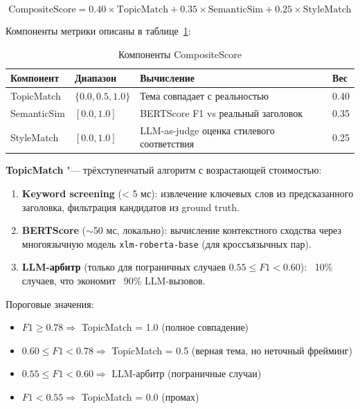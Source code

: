 \begin{equation}
\text{CompositeScore} = 0.40 \times \text{TopicMatch} + 0.35 \times \text{SemanticSim} + 0.25 \times \text{StyleMatch}
\label{eq:composite}
\end{equation}

Компоненты метрики описаны в таблице~\ref{tab:composite_components}:

\begin{table}[h!]
\centering
\caption{Компоненты CompositeScore}
\label{tab:composite_components}
\begin{tabular}{llll}
\toprule
\textbf{Компонент} & \textbf{Диапазон} & \textbf{Вычисление} & \textbf{Вес} \\
\midrule
TopicMatch & $\{0.0, 0.5, 1.0\}$ & Тема совпадает с реальностью & 0.40 \\
SemanticSim & $[0.0, 1.0]$ & BERTScore F1 vs реальный заголовок & 0.35 \\
StyleMatch & $[0.0, 1.0]$ & LLM-as-judge оценка стилевого соответствия & 0.25 \\
\bottomrule
\end{tabular}
\end{table}

\textbf{TopicMatch} "--- трёхступенчатый алгоритм с возрастающей стоимостью:

\begin{enumerate}
    \item \textbf{Keyword screening} (< 5 мс): извлечение ключевых слов из предсказанного заголовка, фильтрация кандидатов из ground truth.
    \item \textbf{BERTScore} ($\sim$50 мс, локально): вычисление контекстного сходства через многоязычную модель \texttt{xlm-roberta-base} (для кроссъязычных пар).
    \item \textbf{LLM-арбитр} (только для пограничных случаев $0.55 \leq F1 < 0.60$): ~10\% случаев, что экономит ~90\% LLM-вызовов.
\end{enumerate}

Пороговые значения:
\begin{itemize}
    \item $F1 \geq 0.78 \Rightarrow$ TopicMatch = 1.0 (полное совпадение)
    \item $0.60 \leq F1 < 0.78 \Rightarrow$ TopicMatch = 0.5 (верная тема, но неточный фрейминг)
    \item $0.55 \leq F1 < 0.60 \Rightarrow$ LLM-арбитр (пограничные случаи)
    \item $F1 < 0.55 \Rightarrow$ TopicMatch = 0.0 (промах)
\end{itemize}


